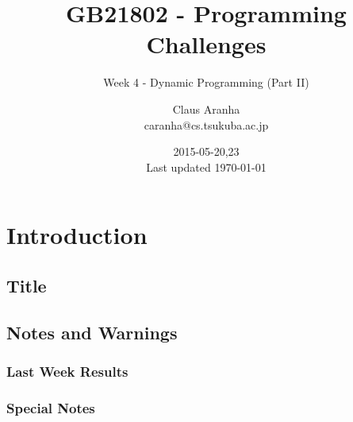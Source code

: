 \documentclass{beamer}
\title[GB21802]{GB21802 - Programming Challenges}
\subtitle[]{Week 4 - Dynamic Programming (Part II)}
\author[Claus Aranha]{Claus Aranha\\{\footnotesize caranha@cs.tsukuba.ac.jp}}
\institute{College of Information Science}
\date{2015-05-20,23\\{\tiny Last updated \today}}
\begin{document}
\section{Introduction}
\subsection{Title}
\begin{frame}
\maketitle
\end{frame}

\subsection{Notes and Warnings}

\begin{frame}
  \frametitle{Last Week Results}
\end{frame}

\begin{frame}
  \frametitle{Special Notes}
\end{frame}
\end{document}
